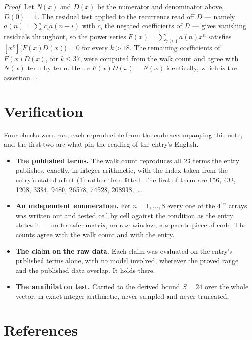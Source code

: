 \documentclass[11pt]{article}
\theoremstyle{definition}
\begin{document}
{\itshape Proof.} Let $N(x)$ and $D(x)$ be the numerator and denominator above, $D(0)=1$. The residual test applied to the recurrence read off $D$ --- namely $a(n) = \sum_i c_i a(n-i)$ with $c_i$ the negated coefficients of $D$ --- gives vanishing residuals throughout, so the power series $F(x)=\sum_{n\ge 1}a(n)x^n$ satisfies $[x^k]\bigl(F(x)D(x)\bigr) = 0$ for every $k > 18$. The remaining coefficients of $F(x)D(x)$, for $k \le 37$, were computed from the walk count and agree with $N(x)$ term by term. Hence $F(x)D(x) = N(x)$ identically, which is the assertion. $\square$

\section{Verification}

Four checks were run, each reproducible from the code accompanying this note, and the first two are what pin the reading of the entry's English.

\begin{itemize}

\item {\bfseries The published terms.} The walk count reproduces all 23 terms the entry publishes, exactly, in integer arithmetic, with the index taken from the entry's stated offset (1) rather than fitted. The first of them are 156, 432, 1208, 3384, 9480, 26578, 74528, 208998,~\dots

\item {\bfseries An independent enumeration.} For $n = 1,\dots,8$ every one of the $4^{1n}$ arrays was written out and tested cell by cell against the condition as the entry states it --- no transfer matrix, no row window, a separate piece of code. The counts agree with the walk count and with the entry.

\item {\bfseries The claim on the raw data.} Each claim was evaluated on the entry's published terms alone, with no model involved, wherever the proved range and the published data overlap. It holds there.

\item {\bfseries The annihilation test.} Carried to the derived bound $S = 24$ over the whole vector, in exact integer arithmetic, never sampled and never truncated.

\end{itemize}

\section{References}
\end{document}
